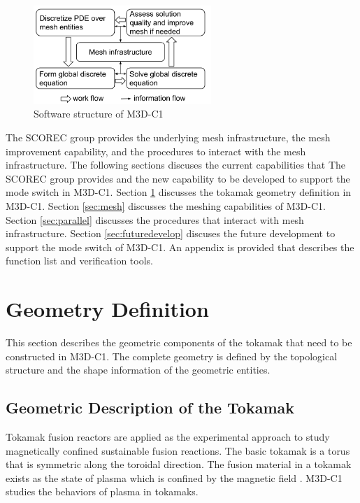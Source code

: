 \documentclass[11pt]{article}  %
\begin{document}
\begin{figure}[hbt]
\center
\includegraphics[width=0.6\textwidth]{fig/m3dc1Structure.png}
\caption{Software structure of M3D-C1} \label{fig:structure}
\end{figure}

The SCOREC group provides the underlying mesh infrastructure, the mesh improvement capability, and the procedures to interact with the mesh infrastructure. The following sections discuses the current capabilities that The SCOREC group provides and the new capability to be developed to support the mode switch in M3D-C1. Section \ref{sec:geo} discusses the tokamak geometry definition in M3D-C1.  Section \ref{sec:mesh} discusses the meshing capabilities of M3D-C1. Section \ref{sec:parallel} discusses the procedures that interact with mesh infrastructure.  Section \ref{sec:futuredevelop} discuses the future development to support the mode switch of M3D-C1. An appendix is provided that describes the function list and verification tools.
\section{Geometry Definition}  \label{sec:geo}
This section describes the geometric components of the tokamak that need to be constructed in M3D-C1. 
The complete geometry is defined by the topological structure and the shape information of the geometric entities. 
\subsection{Geometric Description of the Tokamak}
Tokamak fusion reactors \cite{wesson2011tokamaks} are applied as the experimental approach to study magnetically confined sustainable fusion reactions. The basic tokamak is a torus that is symmetric along
the toroidal direction. The fusion material in a tokamak exists as the state of plasma which is confined by the magnetic field \cite{chen1984introduction}.  M3D-C1 studies the behaviors
of plasma in tokamaks.
\end{document}

